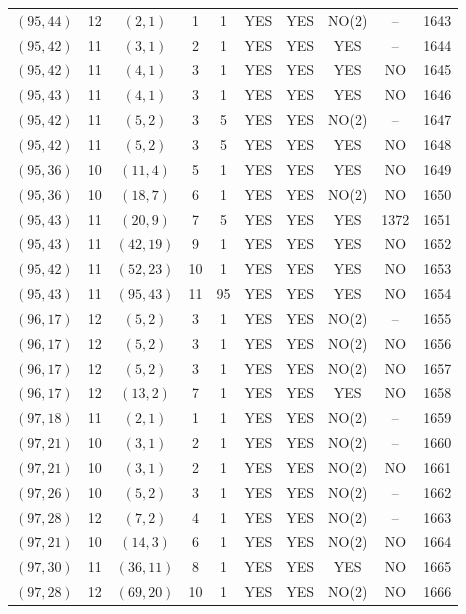 \begin{longtable}{|c|c|c|c|c|c|c|c|c|c|}
$(95, 44)$ & 12 & $(2, 1)$ & 1 & 1 & YES & YES & NO(2) & -- & 1643\\
$(95, 42)$ & 11 & $(3, 1)$ & 2 & 1 & YES & YES & YES & -- & 1644\\
$(95, 42)$ & 11 & $(4, 1)$ & 3 & 1 & YES & YES & YES & NO & 1645\\
$(95, 43)$ & 11 & $(4, 1)$ & 3 & 1 & YES & YES & YES & NO & 1646\\
$(95, 42)$ & 11 & $(5, 2)$ & 3 & 5 & YES & YES & NO(2) & -- & 1647\\
$(95, 42)$ & 11 & $(5, 2)$ & 3 & 5 & YES & YES & YES & NO & 1648\\
$(95, 36)$ & 10 & $(11, 4)$ & 5 & 1 & YES & YES & YES & NO & 1649\\
$(95, 36)$ & 10 & $(18, 7)$ & 6 & 1 & YES & YES & NO(2) & NO & 1650\\
$(95, 43)$ & 11 & $(20, 9)$ & 7 & 5 & YES & YES & YES & 1372 & 1651\\
$(95, 43)$ & 11 & $(42, 19)$ & 9 & 1 & YES & YES & YES & NO & 1652\\
$(95, 42)$ & 11 & $(52, 23)$ & 10 & 1 & YES & YES & YES & NO & 1653\\
$(95, 43)$ & 11 & $(95, 43)$ & 11 & 95 & YES & YES & YES & NO & 1654\\
$(96, 17)$ & 12 & $(5, 2)$ & 3 & 1 & YES & YES & NO(2) & -- & 1655\\
$(96, 17)$ & 12 & $(5, 2)$ & 3 & 1 & YES & YES & NO(2) & NO & 1656\\
$(96, 17)$ & 12 & $(5, 2)$ & 3 & 1 & YES & YES & NO(2) & NO & 1657\\
$(96, 17)$ & 12 & $(13, 2)$ & 7 & 1 & YES & YES & YES & NO & 1658\\
$(97, 18)$ & 11 & $(2, 1)$ & 1 & 1 & YES & YES & NO(2) & -- & 1659\\
$(97, 21)$ & 10 & $(3, 1)$ & 2 & 1 & YES & YES & NO(2) & -- & 1660\\
$(97, 21)$ & 10 & $(3, 1)$ & 2 & 1 & YES & YES & NO(2) & NO & 1661\\
$(97, 26)$ & 10 & $(5, 2)$ & 3 & 1 & YES & YES & NO(2) & -- & 1662\\
$(97, 28)$ & 12 & $(7, 2)$ & 4 & 1 & YES & YES & NO(2) & -- & 1663\\
$(97, 21)$ & 10 & $(14, 3)$ & 6 & 1 & YES & YES & NO(2) & NO & 1664\\
$(97, 30)$ & 11 & $(36, 11)$ & 8 & 1 & YES & YES & YES & NO & 1665\\
$(97, 28)$ & 12 & $(69, 20)$ & 10 & 1 & YES & YES & NO(2) & NO & 1666\\

\end{longtable}
